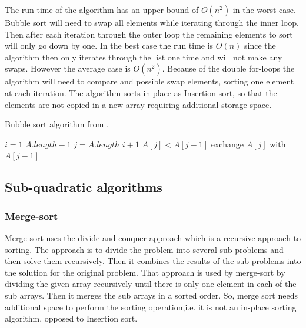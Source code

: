 \documentclass[sigconf, nonacm, natbib, screen, balance=False]{acmart}
\begin{document}
The run time of the algorithm has an upper bound of $O(n^2)$ in the worst case. Bubble sort will need to swap all elements while iterating through the inner loop. Then after each iteration through the outer loop the remaining elements to sort will only go down by one. In the best case the run time is $O(n)$ since the algorithm then only iterates through the list one time and will not make any swaps. However the average case is $O(n^2)$. Because of the double for-loops the algorithm will need to compare and possible swap elements, sorting one element at each iteration.
The algorithm sorts in place as Insertion sort, so that the elements are not copied in a new array requiring additional storage space.

\begin{listing}
  \caption{Bubble sort algorithm from \citet[Ch.~2. p 40 ]{CLRS_2009}.}
  \label{lst:bubble_algo}
\begin{codebox}
\li \For $i = 1$ \To $A.length - 1$
\li \Then \For $j = A.length$ \Downto $i + 1$
\li \Then \If $A[j] < A[j-1]$
\li \Then exchange $A[j]$ with $A[j-1]$
\End
\end{codebox}
\end{listing}
\FloatBarrier

\subsection{Sub-quadratic algorithms}\label{sec:sub-quadratic-algorithms}

\subsubsection{Merge-sort}\label{sec:merge-sort}
Merge sort uses the divide-and-conquer approach which is a recursive approach to sorting. The approach is to divide the problem into several sub problems and then solve them recursively. Then it combines the results of the sub problems into the solution for the original problem.
\citet[Ch.~2.3]{CLRS_2009}
That approach is used by merge-sort by dividing the given array recursively until there is only one element in each of the sub arrays. Then it merges the sub arrays in a sorted order. So, merge sort needs additional space to perform the sorting operation,i.e. it is not an in-place sorting algorithm, opposed to Insertion sort.
\end{document}
